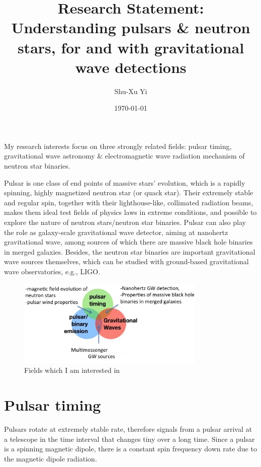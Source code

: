 \documentclass{article}
\begin{document}
\title{Research Statement: Understanding pulsars \& neutron stars, for and with gravitational wave detections}
\author{Shu-Xu Yi}
\date{\today}
\maketitle
My research interests focus on three strongly related fields: pulsar timing, gravitational wave astronomy \& electromagnetic wave radiation mechanism of neutron star binaries. 

Pulsar is one class of end points of massive stars' evolution, which is a rapidly spinning, highly magnetized neutron star (or quack star). Their extremely stable and regular spin, together with their lighthouse-like, collimated radiation beams, makes them ideal test fields of physics laws in extreme conditions, and possible to explore the nature of neutron stars/neutron star binaries. Pulsar can also play the role as galaxy-scale gravitational wave detector, aiming at nanohertz gravitational wave, among sources of which there are massive black hole binaries in merged galaxies. Besides, the neutron star binaries are important gravitational wave sources themselves, which can be studied with ground-based gravitational wave observatories, e.g., LIGO. 
\hspace*{- 4 cm}
\begin{figure}[h!]
\centering
\includegraphics[width =9cm, trim=0 0 2.9cm 0cm]{research_interest_complex.jpg}
\caption{Fields which I am interested in}
\end{figure}
\section{Pulsar timing}
Pulsars rotate at extremely stable rate, therefore signals from a pulsar arrival at a telescope in the time interval that changes tiny over a long time. Since a pulsar is a spinning magnetic dipole, there is a constant spin frequency down rate due to the magnetic dipole radiation.  
\end{document}

